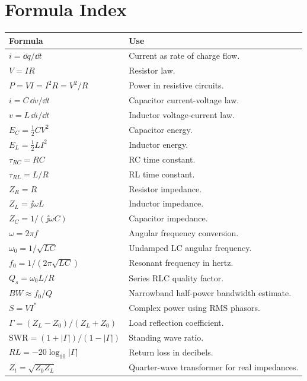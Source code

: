 \chapter{Formula Index}
\begin{longtable}{@{}L{0.34\textwidth}L{0.58\textwidth}@{}}
\toprule
Formula & Use \\
\midrule
\endhead
\(i=\dd q/\dd t\) & Current as rate of charge flow. \\
\(V=IR\) & Resistor law. \\
\(P=VI=I^2R=V^2/R\) & Power in resistive circuits. \\
\(i=C\,\dd v/\dd t\) & Capacitor current-voltage law. \\
\(v=L\,\dd i/\dd t\) & Inductor voltage-current law. \\
\(E_C=\frac{1}{2}CV^2\) & Capacitor energy. \\
\(E_L=\frac{1}{2}LI^2\) & Inductor energy. \\
\(\tau_{RC}=RC\) & RC time constant. \\
\(\tau_{RL}=L/R\) & RL time constant. \\
\(Z_R=R\) & Resistor impedance. \\
\(Z_L=\jj\omega L\) & Inductor impedance. \\
\(Z_C=1/(\jj\omega C)\) & Capacitor impedance. \\
\(\omega=2\pi f\) & Angular frequency conversion. \\
\(\omega_0=1/\sqrt{LC}\) & Undamped LC angular frequency. \\
\(f_0=1/(2\pi\sqrt{LC})\) & Resonant frequency in hertz. \\
\(Q_s=\omega_0L/R\) & Series RLC quality factor. \\
\(BW\approx f_0/Q\) & Narrowband half-power bandwidth estimate. \\
\(S=VI^*\) & Complex power using RMS phasors. \\
\(\Gamma=(Z_L-Z_0)/(Z_L+Z_0)\) & Load reflection coefficient. \\
\(\mathrm{SWR}=(1+|\Gamma|)/(1-|\Gamma|)\) & Standing wave ratio. \\
\(RL=-20\log_{10}|\Gamma|\) & Return loss in decibels. \\
\(Z_t=\sqrt{Z_0Z_L}\) & Quarter-wave transformer for real impedances. \\
\bottomrule
\end{longtable}

